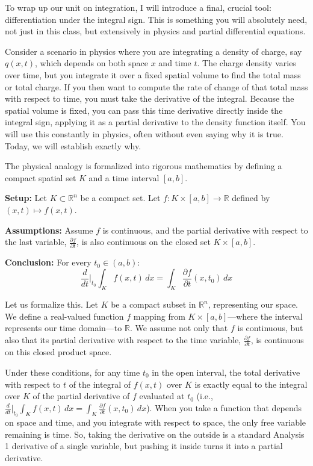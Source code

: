 \begin{spoken-clean}[00:32:56 - 00:37:37]
To wrap up our unit on integration, I will introduce a final, crucial tool: differentiation under the integral sign. This is something you will absolutely need, not just in this class, but extensively in physics and partial differential equations. 

Consider a scenario in physics where you are integrating a density of charge, say $q(x,t)$, which depends on both space $x$ and time $t$. The charge density varies over time, but you integrate it over a fixed spatial volume to find the total mass or total charge. If you then want to compute the rate of change of that total mass with respect to time, you must take the derivative of the integral. Because the spatial volume is fixed, you can pass this time derivative directly inside the integral sign, applying it as a partial derivative to the density function itself. You will use this constantly in physics, often without even saying why it is true. Today, we will establish exactly why.
\end{spoken-clean}

\begin{math-stroke}
The physical analogy is formalized into rigorous mathematics by defining a compact spatial set $K$ and a time interval $[a,b]$.

\textbf{Setup:}
Let $K \subset \mathbb{R}^n$ be a compact set. Let $f: K \times [a,b] \to \mathbb{R}$ defined by $(x,t) \mapsto f(x,t)$.

\textbf{Assumptions:}
Assume $f$ is continuous, and the partial derivative with respect to the last variable, $\frac{\partial f}{\partial t}$, is also continuous on the closed set $K \times [a,b]$.

\textbf{Conclusion:}
For every $t_0 \in (a,b)$:
\[
\frac{d}{dt} \bigg|_{t_0} \int_K f(x,t) \, dx = \int_K \frac{\partial f}{\partial t}(x,t_0) \, dx
\]
\end{math-stroke}

\begin{spoken-clean}[00:37:40 - 00:41:03]
Let us formalize this. Let $K$ be a compact subset in $\mathbb{R}^n$, representing our space. We define a real-valued function $f$ mapping from $K \times [a,b]$—where the interval represents our time domain—to $\mathbb{R}$. We assume not only that $f$ is continuous, but also that its partial derivative with respect to the time variable, $\frac{\partial f}{\partial t}$, is continuous on this closed product space. 

Under these conditions, for any time $t_0$ in the open interval, the total derivative with respect to $t$ of the integral of $f(x,t)$ over $K$ is exactly equal to the integral over $K$ of the partial derivative of $f$ evaluated at $t_0$ (i.e., $\frac{d}{dt} \big|_{t_0} \int_K f(x,t) \, dx = \int_K \frac{\partial f}{\partial t}(x,t_0) \, dx$). When you take a function that depends on space and time, and you integrate with respect to space, the only free variable remaining is time. So, taking the derivative on the outside is a standard Analysis 1 derivative of a single variable, but pushing it inside turns it into a partial derivative.
\end{spoken-clean}

